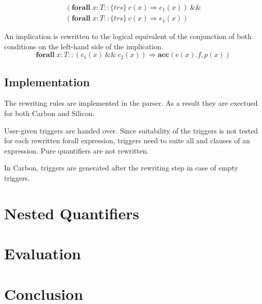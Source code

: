 \documentclass[12pt]{article}
\begin{document}
\begin{equation}
\begin{aligned}
	(\mathbf{forall} \; x:T :: \{trs\}\   c(x)  \Rightarrow e_1(x)) \ \&\& \\
	(\mathbf{forall} \; x:T :: \{trs\}\   c(x) \Rightarrow  e_1(x))
\end{aligned}
\end{equation}

An implication is rewritten to the logical equivalent of the conjunction of both conditions on the left-hand side of the implication.
\begin{equation}
	\mathbf{forall} \; x:T ::( c_1(x) \:\&\&\: c_2(x)) \Rightarrow \mathbf{acc}(e(x).f, p(x))
\end{equation}

\subsection{Implementation}
The rewriting rules are implemented in the parser. As a result they are exectued for both Carbon and Silicon.

User-given triggers are handed over. Since suitability of the triggers is not tested for each rewritten forall expression, triggers need to suite all and clauses of an expression. Pure quantifiers are not rewritten. 

 In Carbon, triggers are generated after the rewriting step in case of empty triggers.


\section{Nested Quantifiers}
\section{Evaluation}
\section{Conclusion}



\end{document}
